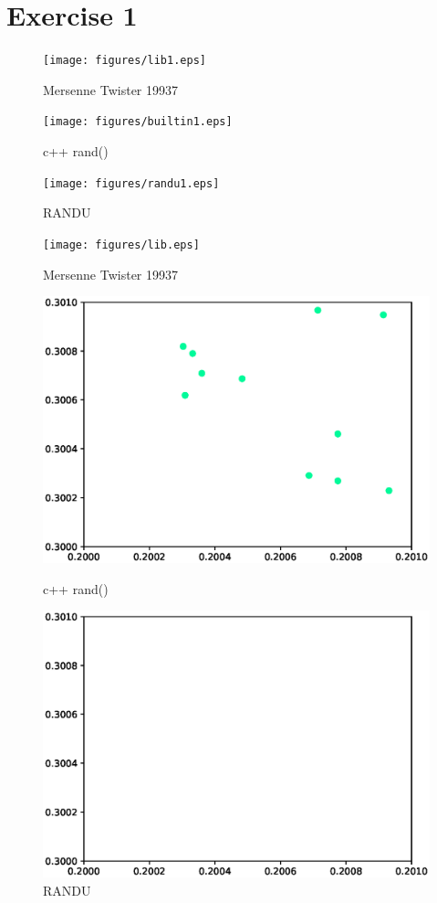 \documentclass[12pt]{article}
\begin{document}
\section*{Exercise 1}
\begin{figure}[h]
\begin{minipage}{0.3\textwidth}
    \texttt{[image: figures/lib1.eps]}
    \caption{Mersenne Twister 19937}
\end{minipage}
\begin{minipage}{0.3\textwidth}
    \texttt{[image: figures/builtin1.eps]}
    \caption{c++ rand()}
\end{minipage}
\begin{minipage}{0.3\textwidth}
    \texttt{[image: figures/randu1.eps]}
    \caption{RANDU}
\end{minipage}
\end{figure}
\begin{figure}[h]
    \begin{minipage}{0.3\textwidth}
        \texttt{[image: figures/lib.eps]}
        \caption{Mersenne Twister 19937}
    \end{minipage}
    \begin{minipage}{0.3\textwidth}
        \includegraphics[width=1.2\textwidth]{figures/builtin.eps}
        \caption{c++ rand()}
    \end{minipage}
    \begin{minipage}{0.3\textwidth}
        \includegraphics[width=1.2\textwidth]{figures/randu.eps}
        \caption{RANDU}
    \end{minipage}
    \end{figure}
\end{document}
